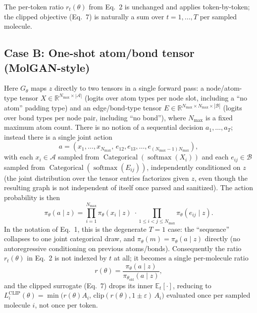 \documentclass[11pt]{article}
\newcommand{\E}{\mathbb{E}}
\newcommand{\1}{\mathbb{1}}
\begin{document}
The per-token ratio $r_t(\theta)$ from Eq.~2 is unchanged and applies
token-by-token; the clipped objective (Eq.~7) is naturally a sum
over $t = 1,\dots,T$ per sampled molecule.

\subsection{Case B: One-shot atom/bond tensor (MolGAN-style)}

Here $G_\theta$ maps $z$ directly to two tensors in a single forward
pass: a node/atom-type tensor $X \in \mathbb{R}^{N_{\max}\times
|\mathcal{A}|}$ (logits over atom types per node slot, including a
``no atom'' padding type) and an edge/bond-type tensor
$E \in \mathbb{R}^{N_{\max}\times N_{\max}\times|\mathcal{B}|}$
(logits over bond types per node pair, including ``no bond''), where
$N_{\max}$ is a fixed maximum atom count. There is no notion of a
sequential decision $a_1,\dots,a_T$; instead there is a single joint
action
\begin{equation}
a = (x_1,\dots,x_{N_{\max}},\, e_{12}, e_{13},\dots, e_{(N_{\max}-1)N_{\max}}),
\end{equation}
with each $x_i \in \mathcal{A}$ sampled from
$\operatorname{Categorical}(\operatorname{softmax}(X_i))$ and each
$e_{ij} \in \mathcal{B}$ sampled from
$\operatorname{Categorical}(\operatorname{softmax}(E_{ij}))$,
independently conditioned on $z$ (the joint distribution over the
tensor entries factorizes given $z$, even though the resulting graph
is not independent of itself once parsed and sanitized). The action
probability is then
\begin{equation}
\pi_\theta(a \mid z) = \prod_{i=1}^{N_{\max}} \pi_\theta(x_i \mid z)
\;\cdot\! \prod_{1\le i<j\le N_{\max}} \pi_\theta(e_{ij}\mid z).
\label{eq:molgan-joint}
\end{equation}
In the notation of Eq.~1, this is the degenerate $T=1$ case: the
``sequence'' collapses to one joint categorical draw, and $\pi_\theta(m)
= \pi_\theta(a\mid z)$ directly (no autoregressive conditioning on
previous atoms/bonds). Consequently the ratio $r_t(\theta)$ in
Eq.~2 is not indexed by $t$ at all; it becomes a single per-molecule
ratio
\begin{equation}
r(\theta) = \frac{\pi_\theta(a\mid z)}{\pi_{\theta_{\mathrm{old}}}(a\mid z)},
\label{eq:molgan-ratio}
\end{equation}
and the clipped surrogate (Eq.~7) drops its inner $\E_t[\cdot]$,
reducing to $L^{\mathrm{CLIP}}_i(\theta) = \min\big(r(\theta) A_i,\,
\mathrm{clip}(r(\theta), 1\pm\varepsilon)\, A_i\big)$ evaluated once
per sampled molecule $i$, not once per token.
\end{document}
